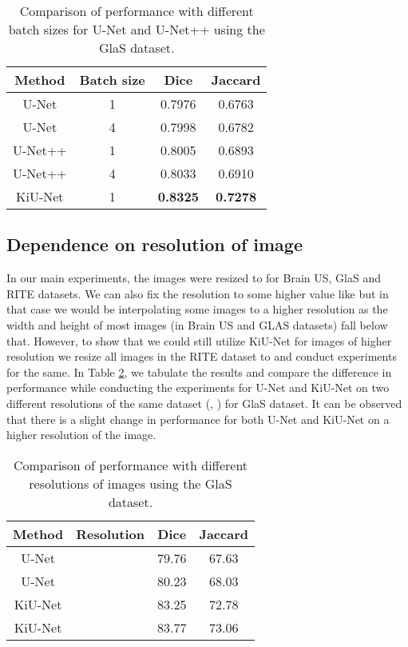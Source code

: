 \documentclass[journal,twoside,web]{ieeecolor}
\begin{document}
\begin{table}[htbp]
	\centering
	\caption{Comparison of performance with different batch sizes for U-Net and U-Net++ using the GlaS dataset.}
	\begin{tabular}{c|c|c|c}
		\hline
		Method    & Batch size & Dice & Jaccard \\ \hline
		U-Net   & 1    & 0.7976 & 0.6763 \\ 
		U-Net & 4    & 0.7998 & 0.6782 \\ \hline
		U-Net++ & 1    & 0.8005 & 0.6893 \\ 
		U-Net++ & 4    & 0.8033 & 0.6910 \\ \hline
		KiU-Net   & 1         & \textbf{0.8325}      & \textbf{0.7278}    
	\end{tabular}
	
	\label{r1q6}
\end{table}

\subsection{Dependence on resolution of image}

In our main experiments, the images were resized to  for Brain US, GlaS and RITE datasets. We can also fix the resolution to some higher value like  but in that case we would be interpolating some images to a higher resolution as the width and height of most images (in Brain US and GLAS datasets) fall below that. However, to show that we could still utilize KiU-Net for images of higher resolution we resize all images in the RITE dataset to  and conduct experiments for the same. In Table \ref{r1q8}, we tabulate the results and compare the difference in performance while conducting the experiments for U-Net and KiU-Net on two different resolutions of the same dataset (, ) for GlaS dataset. It can be observed that there is a slight change in performance for both U-Net and KiU-Net on a higher resolution of the image.

\begin{table}[htbp]
	\centering
	\caption{Comparison of performance with different resolutions of images using the GlaS dataset.}
	\begin{tabular}{c|c|c|c}
		\hline
		Method    & Resolution & Dice & Jaccard \\ \hline
		U-Net   &     &79.76  &67.63  \\ 
		U-Net &     &80.23  &68.03  \\ \hline
		KiU-Net &     &83.25  &72.78 \\ 
		KiU-Net   &          & 83.77     & 73.06     
	\end{tabular}
	
	\label{r1q8}
\end{table}
\end{document}
